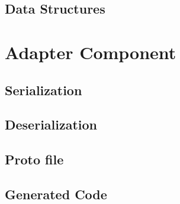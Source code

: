 \subsection{Data Structures}


\section{Adapter Component}
\subsection{Serialization}

\subsection{Deserialization}

\subsection{Proto file}



\subsection{Generated Code}


